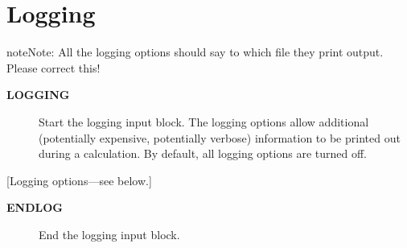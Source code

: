 \documentclass[openany,a4paper,10pt,english]{manual}
\begin{document}
\resetcurrentobjects
\hypertarget{--doc-input/logging}{}

\hypertarget{input-logging}{}\section{Logging}

\begin{notice}{note}{Note:}
All the logging options should say to which file they print output.  Please correct this!
\end{notice}
\begin{description}
\item[\textbf{LOGGING}] \leavevmode
Start the logging input block.  The logging options allow additional
(potentially expensive, potentially verbose) information to be
printed out during a calculation.  By default, all logging options
are turned off.

\end{description}

{[}Logging options---see below.{]}
\begin{description}
\item[\textbf{ENDLOG}] \leavevmode
End the logging input block.

\end{description}
\end{document}
